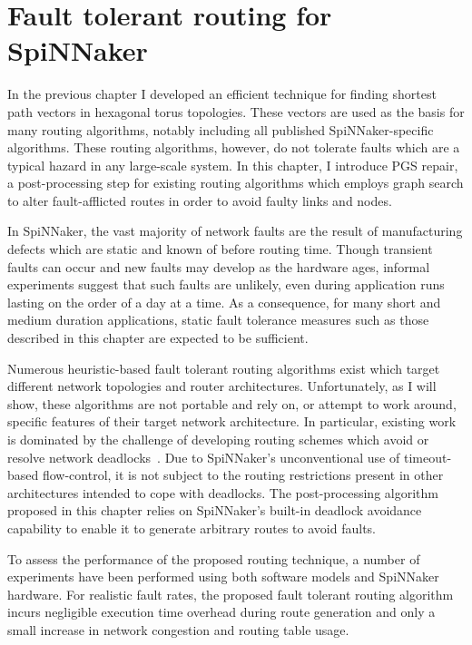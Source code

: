 \chapter{Fault tolerant routing for SpiNNaker}
	
	\label{sec:routing}
	
	In the previous chapter I developed an efficient technique for finding
	shortest path vectors in hexagonal torus topologies. These vectors are used
	as the basis for many routing algorithms, notably including all published
	SpiNNaker-specific algorithms. These routing algorithms, however, do not
	tolerate faults which are a typical hazard in any large-scale system. In this
	chapter, I introduce PGS repair, a post-processing step for existing routing
	algorithms which employs graph search to alter fault-afflicted routes in
	order to avoid faulty links and nodes.
	
	In SpiNNaker, the vast majority of network faults are the result of
	manufacturing defects which are static and known of before routing time.
	Though transient faults can occur and new faults may develop as the hardware
	ages, informal experiments suggest that such faults are unlikely, even during
	application runs lasting on the order of a day at a time. As a consequence,
	for many short and medium duration applications, static fault tolerance
	measures such as those described in this chapter are expected to be
	sufficient.
	
	Numerous heuristic-based fault tolerant routing algorithms exist which target
	different network topologies and router architectures. Unfortunately, as I
	will show, these algorithms are not portable and rely on, or attempt to work
	around, specific features of their target network architecture. In
	particular, existing work is dominated by the challenge of developing routing
	schemes which avoid or resolve network deadlocks~\cite[chapter~14]{dally04}.
	Due to SpiNNaker's unconventional use of timeout-based flow-control, it is
	not subject to the routing restrictions present in other architectures
	intended to cope with deadlocks. The post-processing algorithm proposed in
	this chapter relies on SpiNNaker's built-in deadlock avoidance capability to
	enable it to generate arbitrary routes to avoid faults.
	
	To assess the performance of the proposed routing technique, a number of
	experiments have been performed using both software models and SpiNNaker
	hardware. For realistic fault rates, the proposed fault tolerant routing
	algorithm incurs negligible execution time overhead during route generation
	and only a small increase in network congestion and routing table usage.
	
